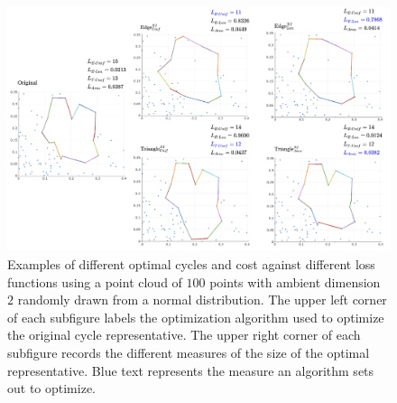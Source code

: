 \documentclass[11pt,onecolumn]{article}
\newcommand{\originalrep}{\mathbf{x}^{Orig}}
\newcommand{\optimalrep}{\mathbf{x}}
\newcommand{\NI}{^{NI}}
\newcommand{\I}{^I}
\newcommand{\EU}{_{E\text{-}Unif}}
\newcommand{\EL}{_{E\text{-}Len}}
\theoremstyle{plain}
\theoremstyle{definition}
\begin{document}




\begin{figure}[hbt!]
\begin{center}
\includegraphics[width=\textwidth]{figures/output_examples.jpg}
\end{center}
\caption{Examples of different optimal cycles and cost against different loss functions using a point cloud of $100$ points with ambient dimension $2$ randomly drawn from a normal distribution. The upper left corner of each subfigure labels the optimization algorithm used to optimize the original cycle representative. The upper right corner of each subfigure records the different measures of the size of the optimal representative. Blue text represents the measure an algorithm sets out to optimize. 
}\label{fig:Examplesofeachoptimalcycles} 
\end{figure}
\end{document}
